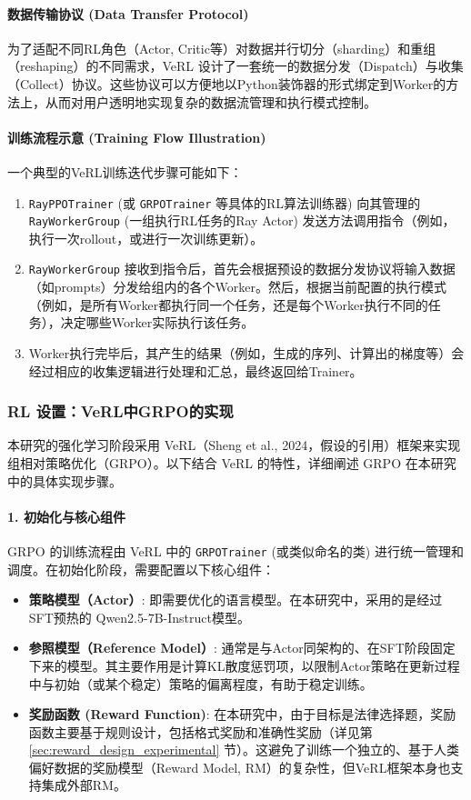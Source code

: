 \documentclass{article}
\newcommand{\qwen}{Qwen2.5-7B-Instruct}
\newcommand{\qwen}{Qwen2.5-7B-Instruct}
\begin{document}
\paragraph{数据传输协议 (Data Transfer Protocol)}
为了适配不同RL角色（Actor, Critic等）对数据并行切分（sharding）和重组（reshaping）的不同需求，VeRL 设计了一套统一的数据分发（Dispatch）与收集（Collect）协议。这些协议可以方便地以Python装饰器的形式绑定到Worker的方法上，从而对用户透明地实现复杂的数据流管理和执行模式控制。

\paragraph{训练流程示意 (Training Flow Illustration)}
一个典型的VeRL训练迭代步骤可能如下：
\begin{enumerate}
    \item \texttt{RayPPOTrainer} (或 \texttt{GRPOTrainer} 等具体的RL算法训练器) 向其管理的 \texttt{RayWorkerGroup} (一组执行RL任务的Ray Actor) 发送方法调用指令（例如，执行一次rollout，或进行一次训练更新）。
    \item \texttt{RayWorkerGroup} 接收到指令后，首先会根据预设的数据分发协议将输入数据（如prompts）分发给组内的各个Worker。然后，根据当前配置的执行模式（例如，是所有Worker都执行同一个任务，还是每个Worker执行不同的任务），决定哪些Worker实际执行该任务。
    \item Worker执行完毕后，其产生的结果（例如，生成的序列、计算出的梯度等）会经过相应的收集逻辑进行处理和汇总，最终返回给Trainer。
\end{enumerate}

\subsubsection{RL 设置：VeRL中GRPO的实现}
本研究的强化学习阶段采用 VeRL（Sheng et al., 2024，假设的引用）框架来实现组相对策略优化（GRPO）。以下结合 VeRL 的特性，详细阐述 GRPO 在本研究中的具体实现步骤。

\paragraph{1. 初始化与核心组件}
GRPO 的训练流程由 VeRL 中的 \texttt{GRPOTrainer} (或类似命名的类) 进行统一管理和调度。在初始化阶段，需要配置以下核心组件：
\begin{itemize}
    \item \textbf{策略模型（Actor）}: 即需要优化的语言模型。在本研究中，采用的是经过SFT预热的 \qwen 模型。
    \item \textbf{参照模型（Reference Model）}: 通常是与Actor同架构的、在SFT阶段固定下来的模型。其主要作用是计算KL散度惩罚项，以限制Actor策略在更新过程中与初始（或某个稳定）策略的偏离程度，有助于稳定训练。
    \item \textbf{奖励函数 (Reward Function)}: 在本研究中，由于目标是法律选择题，奖励函数主要基于规则设计，包括格式奖励和准确性奖励（详见第 \ref{sec:reward_design_experimental} 节）。这避免了训练一个独立的、基于人类偏好数据的奖励模型（Reward Model, RM）的复杂性，但VeRL框架本身也支持集成外部RM。
\end{itemize}
\end{document}
